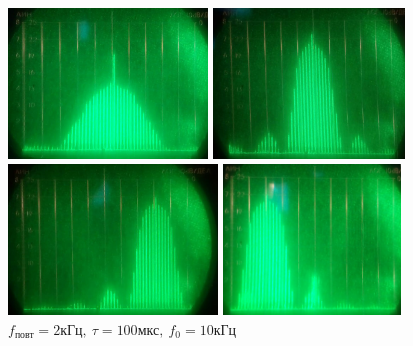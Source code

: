 \documentclass{article}
\begin{document}
   \begin{figure}[h!]
   \begin{minipage}[h!]{0.49\linewidth}
   \centering
   \includegraphics[height=4cm]{B01.jpg} 
   \caption{$f_{\text{повт}} = 1 \text{кГц},~ \tau = 50 \text{мкс},~ f_{0} = 25 \text{кГц}$} 
   \label{fig.b01} 
   \end{minipage}
   \hfill
   \begin{minipage}[h!]{0.49\linewidth}
   \centering
   \includegraphics[height=4cm]{B02.jpg} 
   \caption{$f_{\text{повт}} = 1 \text{кГц},~ \tau = 100 \text{мкс},~ f_{0} = 25 \text{кГц}$} 
   \label{fig.b02}
   \end{minipage}
   \hfill
   \begin{minipage}[h!]{0.49\linewidth}
   \centering
   \includegraphics[height=4cm]{B03.jpg} 
   \caption{$f_{\text{повт}} = 2 \text{кГц},~ \tau = 100 \text{мкс},~ f_{0} = 40 \text{кГц}$} 
   \label{fig.b03}
   \end{minipage}
   \hfill
   \begin{minipage}[h!]{0.49\linewidth}
   \centering
   \includegraphics[height=4cm]{B04.jpg} 
   \caption{$f_{\text{повт}} = 2 \text{кГц},~ \tau = 100 \text{мкс},~ f_{0} = 10 \text{кГц}$} 
   \label{fig.b04}
   \end{minipage}  
   \end{figure}
\end{document}
